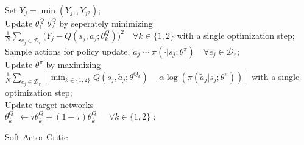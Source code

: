 \begin{algorithm}
{{			Set $Y_j = \min(Y_{j1}, Y_{j2})$; \\	
			Update $\theta^Q_1$ $\theta^Q_2$ by seperately minimizing $ \frac{1}{N}\sum_{e_j \in \mathcal{D}_{r}} \big( Y_j - Q(s_j,a_j;\theta^Q_k) \big) ^ 2 \quad \forall k \in \{1,2\}$ with a single optimization step; \\
			Sample actions for policy update,
			$\widetilde{a}_j \sim \pi(\cdot|s_j;\theta^{\pi}) \quad \forall e_j \in \mathcal{D}_{r}$; \\		
			Update $\theta^\pi$ by maximizing $ \frac{1}{N}\sum_{e_j \in \mathcal{D}_{r}} [\min_{k\in\{1,2\}} Q(s_j,\widetilde{a}_j;\theta^{Q_k})-\alpha\log(\pi(\widetilde{a}_j|s_j;\theta^\pi))]$ with a single optimization step; \\
			Update target networks \\
			$\theta^{Q^-}_k \leftarrow \tau \theta^{Q}_k + (1-\tau) \theta^{Q^-}_k \quad \forall k \in \{1,2\}$ ;

		}
	}
	\caption{Soft Actor Critic}
	\label{alg:sac}
\end{algorithm}
  
